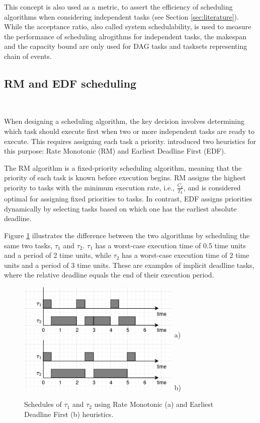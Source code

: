 This concept is also used as a metric, to assert the efficiency
of scheduling algorithms when considering independent tasks (see Section \ref{sec:literature}).
\\


While the acceptance ratio, also called system schedulability, is used 
to measure the performance of scheduling alrogithms for independent tasks,
the makespan and the capacity bound are only used for DAG tasks and tasksets representing chain of events.

\subsection{RM and EDF scheduling}
~

When designing a scheduling algorithm, the key decision involves 
determining which task should execute first when two or more 
independent tasks are ready to execute. This requires assigning each 
task a priority. \cite{liu1973scheduling} introduced two 
heuristics for this purpose: Rate Monotonic (RM) and Earliest 
Deadline First (EDF).

The RM algorithm is a fixed-priority scheduling algorithm, 
meaning that the priority of each task is known before execution 
begins. RM assigns the highest priority to tasks with the minimum 
execution rate, i.e., $\frac{C_k}{T_k}$, and is considered optimal 
for assigning fixed priorities to tasks. In contrast, EDF assigns 
priorities dynamically by selecting tasks based on which one has 
the earliest absolute deadline.

Figure \ref{fig:edf_rm_examples} illustrates the difference 
between the two algorithms by scheduling the same two tasks, 
$\tau_1$ and $\tau_2$. $\tau_1$ has a worst-case execution time of 0.5 time units 
and a period of 2 time units, while $\tau_2$ has a worst-case execution 
time of 2 time units and a period of 3 time units. These are 
examples of implicit deadline tasks, where the relative deadline 
equals the end of their execution period. 

\begin{figure}
    \centering
    \includegraphics[width=\linewidth, height=100px]{images/schedule_rm.png}
    a)
    \includegraphics[width=\linewidth, height=100px]{images/schedule_edf.png}
    b)
    \caption{Schedules of $\tau_1$ and $\tau_2$ using Rate Monotonic (a)
    and Earliest Deadline First (b) heuristics.}
    \label{fig:edf_rm_examples}
\end{figure}

